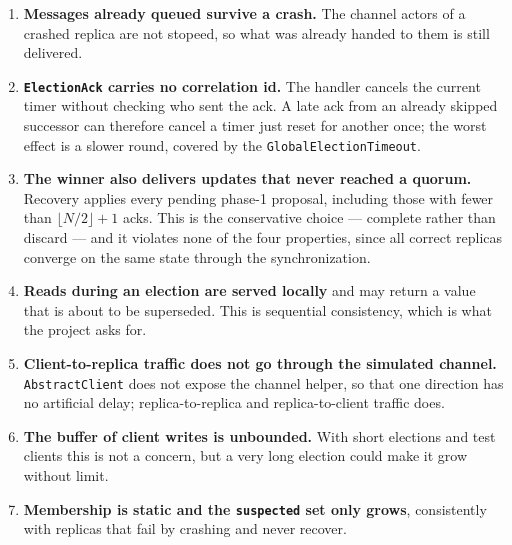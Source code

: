 \begin{enumerate}[nosep]
\item \textbf{Messages already queued survive a crash.} The channel actors of a crashed replica are not stopeed, so what was already handed to them is still delivered.
\item \textbf{\texttt{ElectionAck} carries no correlation id.} The handler cancels the current timer without checking who sent the ack. A late ack from an already skipped successor can therefore cancel a timer just reset for another once; the worst effect is a slower round, covered by the \texttt{GlobalElectionTimeout}.
\item \textbf{The winner also delivers updates that never reached a quorum.} Recovery applies every pending phase-1 proposal, including those with fewer than $\lfloor N/2 \rfloor + 1$ acks. This is the conservative choice --- complete rather than discard --- and it violates none of the four properties, since all correct replicas converge on the same state through the synchronization.
\item \textbf{Reads during an election are served locally} and may return a value that is about to be superseded. This is sequential consistency, which is what the project asks for.
\item \textbf{Client-to-replica traffic does not go through the simulated channel.} \texttt{AbstractClient} does not expose the channel helper, so that one direction has no artificial delay; replica-to-replica and replica-to-client traffic does.
\item \textbf{The buffer of client writes is unbounded.} With short elections and test clients this is not a concern, but a very long election could make it grow without limit.
\item \textbf{Membership is static and the \texttt{suspected} set only grows}, consistently with replicas that fail by crashing and never recover.
\end{enumerate}
